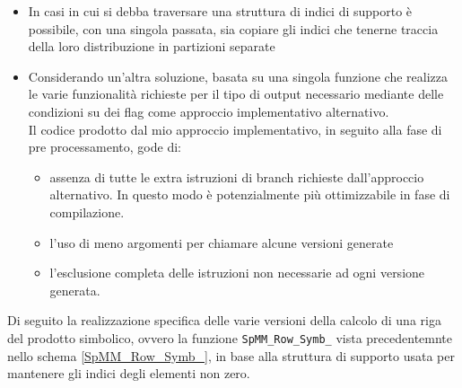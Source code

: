 \begin{itemize}
	\item In casi in cui si debba traversare una struttura di indici di supporto
		  è possibile,  con una singola passata, 
		  sia copiare gli indici che tenerne traccia della loro distribuzione in partizioni separate 

	\item Considerando un'altra soluzione, basata su una singola funzione che realizza le varie  %
		  funzionalità richieste per il tipo di output necessario mediante delle condizioni su dei flag come approccio implementativo alternativo.\\
		  Il codice prodotto dal mio approccio implementativo, in seguito alla fase di pre processamento, gode di:
	\begin{itemize}
		\item assenza di tutte le extra istruzioni di branch richieste dall'approccio alternativo. 
			  In questo modo è potenzialmente più ottimizzabile in fase di compilazione.
		\item l'uso di meno argomenti per chiamare alcune versioni generate 
		\item l'esclusione completa delle istruzioni non necessarie ad ogni versione generata.
	\end{itemize}
\end{itemize}
\label{chSpMMSymb:SpMM_Row_Symb_targetBaseFunc}
Di seguito la realizzazione specifica delle varie versioni della calcolo di una riga del prodotto simbolico,
ovvero la funzione \verb|SpMM_Row_Symb_| vista precedentemnte nello schema \ref{SpMM_Row_Symb_},
in base alla struttura di supporto usata per mantenere gli indici degli elementi non zero. 
